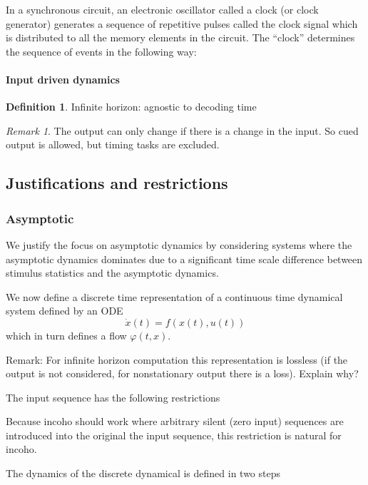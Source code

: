 \documentclass{scrartcl}
\theoremstyle{definition}
\newtheorem{definition}{Definition}
\theoremstyle{remark}
\newtheorem{remark}{Remark}
\begin{document}
In a synchronous circuit, an electronic oscillator called a clock (or clock generator) generates a sequence of repetitive pulses called the clock signal which is distributed to all the memory elements in the circuit. 
The ``clock'' determines the sequence of events in the following way:
\paragraph{Input driven dynamics}


\begin{definition}
Infinite horizon: agnostic to decoding time
\end{definition}

\begin{remark}
The output can only change if there is a change in the input. 
So cued output is allowed, but timing tasks are excluded.
\end{remark}

\subsection{Justifications and restrictions}\label{sec:jar}
\subsubsection{Asymptotic}
We justify the focus on asymptotic dynamics by considering systems where the asymptotic dynamics dominates due to a significant time scale difference between stimulus statistics and the asymptotic dynamics.


We now define a discrete time representation of a continuous time dynamical system defined by an ODE
\begin{equation}\label{eq:inputdriven}
\dot x(t) = f(x(t), u(t))
\end{equation}
which in turn defines a flow $\varphi(t,x)$.

Remark: For infinite horizon computation this representation is lossless (if the output is not considered, for nonstationary output there is a loss).
Explain why?

The input sequence has the following restrictions

Because incoho should work where arbitrary silent (zero input) sequences are introduced into the original the input sequence, this restriction is natural for incoho.

The dynamics of the discrete dynamical is defined in two steps
\end{document}
